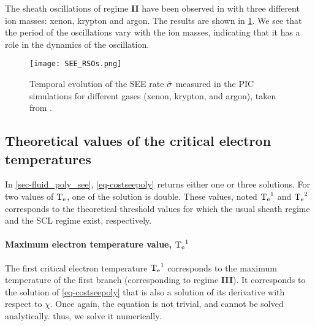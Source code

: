     
    The sheath oscillations of regime {\bf II} have been observed in \citet{croes2017} with three different ion masses: xenon, krypton and argon.
    The results are shown in \cref{fig-RSO_altern}.
    We see that the period of the oscillations vary with the ion masses, indicating that it has a role in the dynamics of the oscillation.
    \begin{figure}[hbtp]
      \centering
      \texttt{[image: SEE\_RSOs.png]}
      \caption{Temporal evolution of the SEE rate $ \bar{\sigma }$ measured in the PIC simulations for different gases (xenon, krypton, and argon), taken from \citet{croes2017}.}
      \label{fig-RSO_altern}
    \end{figure}
    
    \subsection{Theoretical values of the critical electron temperatures} \label{subsec-theo_Tecr}
    In \cref{sec-fluid_poly_see}, \cref{eq-costseepoly} returns either one or three solutions.
    For two values of $\mathrm{T_e}$, one of the solution is double.
    These values, noted $\mathrm{T_e}^1$ and $\mathrm{T_e}^2$ corresponds to the theoretical threshold values for which the usual sheath regime and  the \ac{SCL} regime exist, respectively.
    
    \paragraph{Maximum electron temperature value, $\mathrm{T_e}^1$\\}
    
    The first critical electron temperature  $\mathrm{T_e}^1$  corresponds to the maximum temperature of the first branch (corresponding to regime {\bf III}).
    It corresponds to the solution of \cref{eq-costseepoly} that is also a solution of its derivative with respect to $\chi$.
    Once again, the equation is not trivial, and cannot be solved analytically.
    thus, we solve it numerically.

